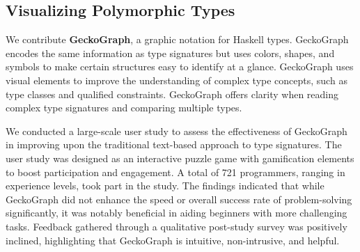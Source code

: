 \subsection{Visualizing Polymorphic Types}

We contribute \textbf{GeckoGraph}, a graphic notation for Haskell types. GeckoGraph encodes the same information as type signatures but uses colors, shapes, and symbols to make certain structures easy to identify at a glance. GeckoGraph uses visual elements to improve the understanding of complex type concepts, such as type classes and qualified constraints. GeckoGraph offers clarity when reading complex type signatures and comparing multiple types.

We conducted a large-scale user study to assess the effectiveness of GeckoGraph in improving upon the traditional text-based approach to type signatures. The user study was designed as an interactive puzzle game with gamification elements to boost participation and engagement. A total of 721 programmers, ranging in experience levels, took part in the study. The findings indicated that while GeckoGraph did not enhance the speed or overall success rate of problem-solving significantly, it was notably beneficial in aiding beginners with more challenging tasks. Feedback gathered through a qualitative post-study survey was positively inclined, highlighting that GeckoGraph is intuitive, non-intrusive, and helpful.






